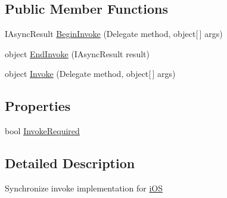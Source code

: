 \subsection*{Public Member Functions}
\begin{DoxyCompactItemize}
\item 
I\+Async\+Result \hyperlink{class_field_service_1_1i_o_s_1_1_synchronize_invoke_af9a61af9fdb32c283f288b29c865e750}{Begin\+Invoke} (Delegate method, object\mbox{[}$\,$\mbox{]} args)
\item 
object \hyperlink{class_field_service_1_1i_o_s_1_1_synchronize_invoke_aeae2a5e8950ed73517f5a7b8f3231c8f}{End\+Invoke} (I\+Async\+Result result)
\item 
object \hyperlink{class_field_service_1_1i_o_s_1_1_synchronize_invoke_a01ed537dd1e5dffeae169dc85ec06ae3}{Invoke} (Delegate method, object\mbox{[}$\,$\mbox{]} args)
\end{DoxyCompactItemize}
\subsection*{Properties}
\begin{DoxyCompactItemize}
\item 
bool \hyperlink{class_field_service_1_1i_o_s_1_1_synchronize_invoke_aa4a7dffc956118db80b131031c8bcfb8}{Invoke\+Required}
\end{DoxyCompactItemize}


\subsection{Detailed Description}
Synchronize invoke implementation for \hyperlink{namespace_field_service_1_1i_o_s}{i\+O\+S} 



